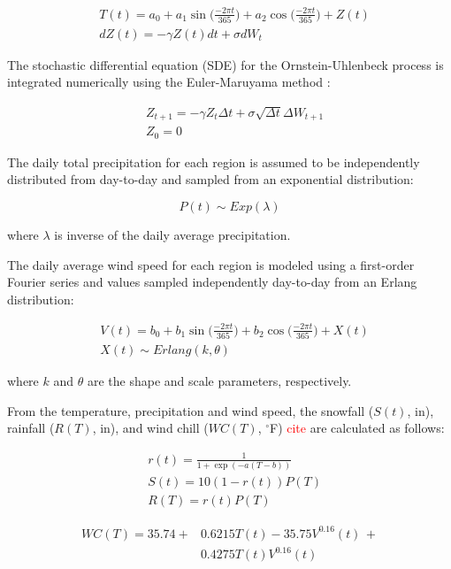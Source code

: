\documentclass[conference]{IEEEtran}
\begin{document}
\begin{align}
&T(t) = a_0 + a_1\sin\Big(\frac{-2 \pi t}{365}\Big) + a_2\cos\Big(\frac{-2 \pi t}{365}\Big) + Z(t) \\
&dZ(t) = - \gamma Z(t) dt + \sigma dW_t
\end{align}

The stochastic differential equation (SDE) for the Ornstein-Uhlenbeck process is integrated numerically using the Euler-Maruyama method \cite{Klouden13}:

\begin{align}
&Z_{t+1} = -\gamma Z_t \Delta t + \sigma \sqrt{\Delta t} \Delta W_{t+1} \\
&Z_0 = 0 \nonumber
\end{align}

The daily total precipitation for each region is assumed to be independently distributed from day-to-day and sampled from an exponential distribution:

\begin{equation}
P(t) \sim Exp(\lambda)
\end{equation}

where $\lambda$ is inverse of the daily average precipitation.

The daily average wind speed for each region is modeled using a first-order Fourier series and values sampled independently day-to-day from an Erlang distribution:

\begin{align}
&V(t) = b_0 + b_1\sin\Big(\frac{-2 \pi t}{365}\Big) + b_2\cos\Big(\frac{-2 \pi t}{365}\Big) + X(t) \\
&X(t) \sim Erlang(k, \theta)
\end{align}

where $k$ and $\theta$ are the shape and scale parameters, respectively.

From the temperature, precipitation and wind speed, the snowfall ($S(t)$, in), rainfall ($R(T)$, in), and wind chill ($WC(T)$, $^\circ$F) \textcolor{red}{cite} are calculated as follows:

\begin{align}
&r(t) = \frac{1}{1 + \exp(-a (T - b))} \\
&S(t) = 10 (1 - r(t)) P(T) \\
&R(T) = r(t) P(T)
\end{align}

\begin{align}
WC(T) = 35.74 + &0.6215T(t) - 35.75V^{0.16}(t) \, + \\ \nonumber
&0.4275T(t)V^{0.16}(t)
\end{align}
\end{document}
